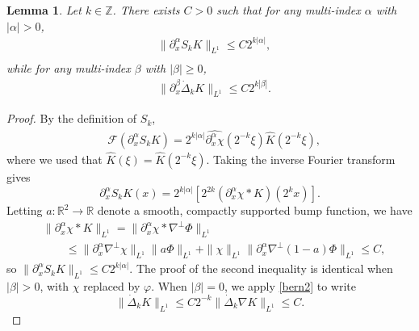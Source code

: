 \documentclass[11pt,reqno,xcolor=svgnames]{amsart}
\def\R{{\mathbb R}}
\def\Z{{\mathbb Z}}
\theoremstyle{plain}
\newtheorem{lemma}[theorem]{Lemma}
\theoremstyle{definition}
\theoremstyle{plain}
\theoremstyle{remark}
\newcommand{\wh}{\widehat}
\begin{document}
\begin{lemma}\label{SNKbound} 
Let $k\in\Z$.  There exists $C>0$ such that for any multi-index $\alpha$ with $|\alpha|>0$,
\begin{equation*}
\begin{split}
&\| {\partial}^{\alpha}_x S_k K\|_{L^{1}} \leq C2^{k|\alpha|},\\
\end{split}
\end{equation*}
while for any multi-index $\beta$ with $|\beta|\geq 0$,
\begin{equation*}
\begin{split}
&\| {\partial}^{\beta}_x \dot{\Delta}_k K\|_{L^{1}} \leq C2^{k|\beta|}.
\end{split}
\end{equation*}
\end{lemma}
\begin{proof}
By the definition of $S_{k}$,
\begin{equation*}
\begin{split}
&\mathcal{F}({\partial}^{\alpha}_x S_{k}K) = 2^{k|\alpha|}\widehat{{\partial}^{\alpha}_x\chi} (2^{-k}\xi)\wh{K}(2^{-k}\xi), 
\end{split}
\end{equation*} 
where we used that $\wh{K} (\xi)= \wh{K} (2^{-k}\xi)$.  Taking the inverse Fourier transform gives
$$ {\partial}^{\alpha}_x S_{k}K(x) =  2^{k|\alpha|} [2^{2k}({\partial}^{\alpha}_x\chi \ast K) (2^{k}x)].$$ 
Letting $a:\R^2\rightarrow\R$ denote a smooth, compactly supported bump function, we have   
\begin{equation}\label{lowfreqkernelL1}
\begin{split}
&\| {\partial}^{\alpha}_x \chi \ast K\|_{L^1} = \| {\partial}^{\alpha}_x \chi \ast \nabla^{\perp}\Phi \|_{L^1}\\
&\qquad \leq \| {\partial}^{\alpha}_x\nabla^{\perp}\chi \|_{L^1} \| a\Phi\|_{L^1} + \| \chi \|_{L^1} \|{\partial}^{\alpha}_x\nabla^{\perp}(1-a)\Phi \|_{L^1}  \leq C, 
\end{split}
\end{equation}
so $\| {\partial}^{\alpha}_x S_{k}K \|_{L^1} \leq C2^{k|\alpha|}$.
The proof of the second inequality is identical when $|\beta|>0$, with $\chi$ replaced by $\varphi$.  When $|\beta|=0$, we apply \cref{bern2} to write 
$$\| \dot{\Delta}_k K\|_{L^{1}} \leq C2^{-k}\| \dot{\Delta}_k \nabla K\|_{L^{1}} \leq C.$$
\end{proof}
\end{document}
